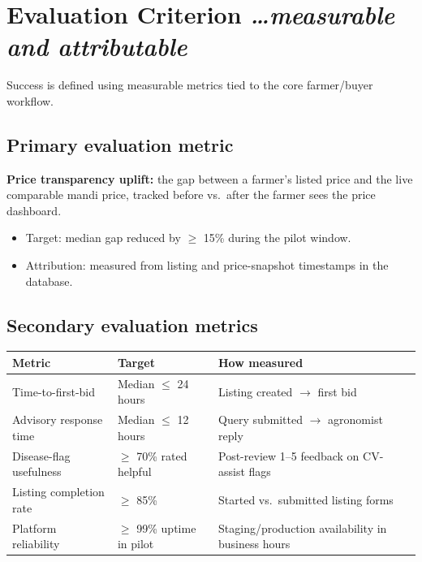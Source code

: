 \documentclass[11pt,a4paper]{article}
\newcommand{\BvrHint}[1]{%
  {\normalfont\normalsize\itshape\hfill #1}}
\begin{document}
\section{Evaluation Criterion %
  \BvrHint{\ldots measurable and attributable}}
Success is defined using measurable metrics tied to the core farmer/buyer workflow.

\subsection{Primary evaluation metric}
\textbf{Price transparency uplift:} the gap between a farmer's listed price and the live comparable mandi price, tracked before vs.\ after the farmer sees the price dashboard.
\begin{itemize}[leftmargin=0.7cm]
    \item Target: median gap reduced by $\ge$ 15\% during the pilot window.
    \item Attribution: measured from listing and price-snapshot timestamps in the database.
\end{itemize}

\subsection{Secondary evaluation metrics}
\begin{center}
\begin{tabular}{@{}p{}p{}p{}@{}}
\toprule
\textbf{Metric} & \textbf{Target} & \textbf{How measured} \\
\midrule
Time-to-first-bid & Median $\le$ 24 hours & Listing created $\rightarrow$ first bid \\
Advisory response time & Median $\le$ 12 hours & Query submitted $\rightarrow$ agronomist reply \\
Disease-flag usefulness & $\ge$ 70\% rated helpful & Post-review 1--5 feedback on CV-assist flags \\
Listing completion rate & $\ge$ 85\% & Started vs.\ submitted listing forms \\
Platform reliability & $\ge$ 99\% uptime in pilot & Staging/production availability in business hours \\
\bottomrule
\end{tabular}
\end{center}
\end{document}
